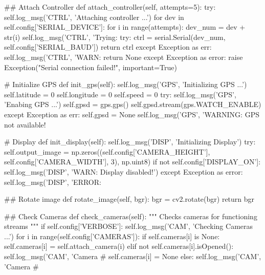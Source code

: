 \begin{python}
    ## Attach Controller
    def attach_controller(self, attempts=5):
        try:
            self.log_msg('CTRL', 'Attaching controller ...')
            for dev in self.config['SERIAL_DEVICE']:
                for i in range(attempts):
                    dev_num = dev + str(i)
                    self.log_msg('CTRL', 'Trying: %
                    try:
                        ctrl = serial.Serial(dev_num, self.config['SERIAL_BAUD'])
                        return ctrl
                    except Exception as err:
                        self.log_msg('CTRL', 'WARN: %
            return None
        except Exception as error:
            raise Exception("Serial connection failed!", important=True)

    # Initialize GPS
    def init_gps(self):
        self.log_msg('GPS', 'Initializing GPS ...')
        self.latitude = 0
        self.longitude = 0
        self.speed = 0
        try:
            self.log_msg('GPS', 'Enabing GPS ...')
            self.gpsd = gps.gps()
            self.gpsd.stream(gps.WATCH_ENABLE)
        except Exception as err:
            self.gpsd = None
            self.log_msg('GPS', 'WARNING: GPS not available! %
    
    # Display
    def init_display(self):
        self.log_msg('DISP', 'Initializing Display')
        try:
            self.output_image = np.zeros((self.config['CAMERA_HEIGHT'], self.config['CAMERA_WIDTH'], 3), np.uint8)
            if not self.config['DISPLAY_ON']:
                self.log_msg('DISP', 'WARN: Display disabled!')
        except Exception as error:
            self.log_msg('DISP', 'ERROR: %

    ## Rotate image
    def rotate_image(self, bgr):
        bgr = cv2.rotate(bgr)
        return bgr
    
    ## Check Cameras
    def check_cameras(self):
        """ Checks cameras for functioning streams """
        if self.config['VERBOSE']: self.log_msg('CAM', 'Checking Cameras ...')
        for i in range(self.config['CAMERAS']):
            if self.cameras[i] is None:
                self.cameras[i] = self.attach_camera(i)
            elif not self.cameras[i].isOpened():
                self.log_msg('CAM', 'Camera #%
                self.cameras[i] = None
            else:
                self.log_msg('CAM', 'Camera #%


\end{python}

